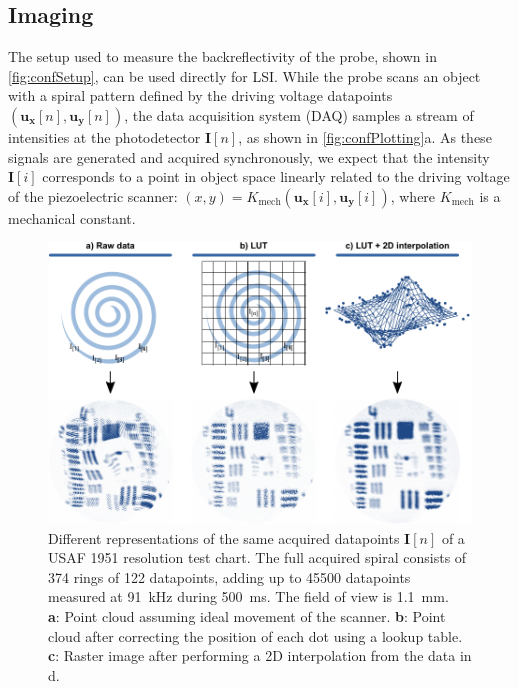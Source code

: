 \subsection{Imaging}
The setup used to measure the backreflectivity of the probe, shown in \autoref{fig:confSetup}, can be used directly for LSI. While the probe scans an object with a spiral pattern defined by the driving voltage datapoints $(\mathbf{u_x}[n], \mathbf{u_y}[n])$, the data acquisition system (DAQ) samples a stream of intensities at the photodetector $\mathbf{I}[n]$, as shown in \autoref{fig:confPlotting}a. As these signals are generated and acquired synchronously, we expect that the intensity $\mathbf{I}[i]$ corresponds to a point in object space linearly related to the driving voltage of the piezoelectric scanner: $(x, y) = K_\mathrm{mech}(\mathbf{u_x}[i], \mathbf{u_y}[i])$, where $K_\mathrm{mech}$ is a mechanical constant.

\begin{figure}[h!]\centering \includegraphics{figures/50_Measurements/conf/proc/Plotting.pdf}
      \caption{Different representations of the same acquired datapoints $\mathbf{I}[n]$ of a USAF 1951 resolution test chart. The full acquired spiral consists of 374 rings of 122 datapoints, adding up to 45500 datapoints measured at \SI{91}{\kilo\hertz} during \SI{500}{\milli\second}. The field of view is \SI{1.1}{\milli\meter}.\\
      \textbf{a}: Point cloud assuming ideal movement of the scanner.
      \textbf{b}: Point cloud after correcting the position of each dot using a lookup table.
      \textbf{c}: Raster image after performing a 2D interpolation from the data in d.}
      \label{fig:confPlotting}
\end{figure}


